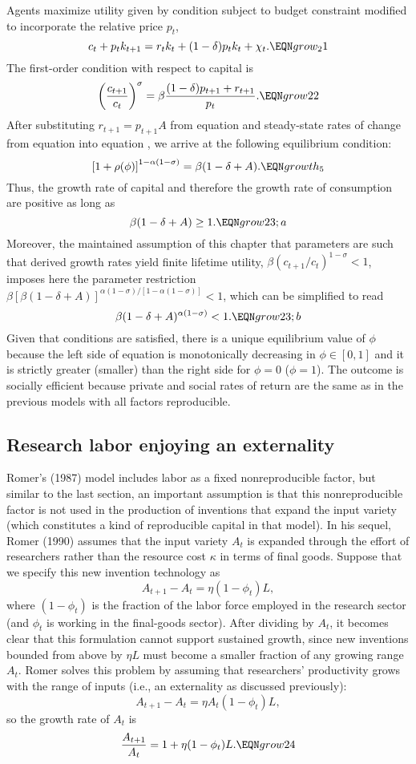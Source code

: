 Agents maximize utility given by condition  subject to budget constraint
 modified to incorporate the relative price $p_t$,
$$
c_t + p_t k_{t+1} = r_t k_t + (1-\delta) p_t k_t + \chi_t.         \EQN grow_21
$$
The first-order condition with respect to capital is
$$
\left( {c_{t+1} \over c_t} \right)^\sigma
      = \beta {(1-\delta)p_{t+1} + r_{t+1} \over p_t}.             \EQN grow22
$$
After substituting $r_{t+1}=p_{t+1}A$ from equation 
and steady-state rates of change from equation  into equation
, we arrive at the following equilibrium condition:
$$
\left[1+\rho(\phi)\right]^{1-\alpha (1-\sigma)} = \beta (1-\delta +A). \EQN growth_5
$$
Thus, the growth rate of capital and therefore the growth rate of consumption
are positive as long as
$$
\beta (1-\delta +A)\geq 1.                                          \EQN grow23;a
$$
Moreover, the maintained
assumption of this chapter that parameters are such that derived growth rates
yield finite lifetime utility, $\beta (c_{t+1}/c_t)^{1-\sigma} <1$, imposes
here the parameter restriction
$\beta[\beta(1-\delta +A)]^{\alpha (1-\sigma)/[1-\alpha (1-\sigma)]}<1$, which
can be simplified to read
$$
\beta (1-\delta +A)^{\alpha (1-\sigma)}<1.                        \EQN grow23;b
$$
Given that conditions  are satisfied, there is a unique equilibrium
value of $\phi$ because the left side of equation  is
monotonically decreasing in $\phi\in[0,1]$ and it is strictly greater (smaller)
than the right side for $\phi=0$ ($\phi=1$). The outcome is socially
efficient because private and social rates of return are the same as in the
previous models with all factors reproducible.
\subsection{Research labor enjoying an externality}
Romer's (1987)
%
 model includes labor as a fixed nonreproducible factor,
but similar to the last section, an important assumption is that this
nonreproducible factor is not used in the production of inventions that
expand the input variety (which constitutes a kind of reproducible
capital in that model).  In his sequel, Romer (1990) assumes that
the input variety $A_t$ is expanded through the effort of researchers
rather than the resource cost $\kappa$ in terms of final goods.  Suppose
that we specify this new invention technology as
$$
A_{t+1} - A_t = \eta (1-\phi_t) L,
$$
where $(1-\phi_t)$ is the fraction of the labor force employed in the research
sector (and $\phi_t$ is working in the final-goods sector). After dividing by
$A_t$, it becomes clear that this formulation cannot support sustained growth,
since new inventions bounded from above by $\eta L$ must become a smaller
fraction of any growing range $A_t$. Romer solves this problem by assuming
that researchers' productivity grows with the range of inputs (i.e., an
externality as discussed previously):
$$
A_{t+1} - A_t = \eta A_t (1-\phi_t) L,
$$
so the growth rate of $A_t$ is
$$
{A_{t+1} \over A_t} = 1 + \eta (1-\phi_t) L.                   \EQN grow24
$$

